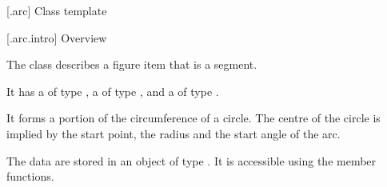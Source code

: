 [\iotwod.arc] {Class template }

 [\iotwod.arc.intro] {Overview}

\pnum
{}%
The class  describes a figure item that is a segment.

\pnum
It has a  of type , a  of type , and a  of type .

\pnum
It forms a portion of the circumference of a circle. The centre of the circle is implied by the start point, the radius and the start angle of the arc.

\pnum
The data are stored in an object of type . It is accessible using the  member functions.

